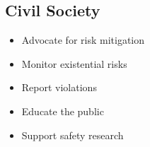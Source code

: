 \subsection{Civil Society}

\begin{itemize}
    \item Advocate for risk mitigation
    \item Monitor existential risks
    \item Report violations
    \item Educate the public
    \item Support safety research
\end{itemize}

\cleardoublepage

